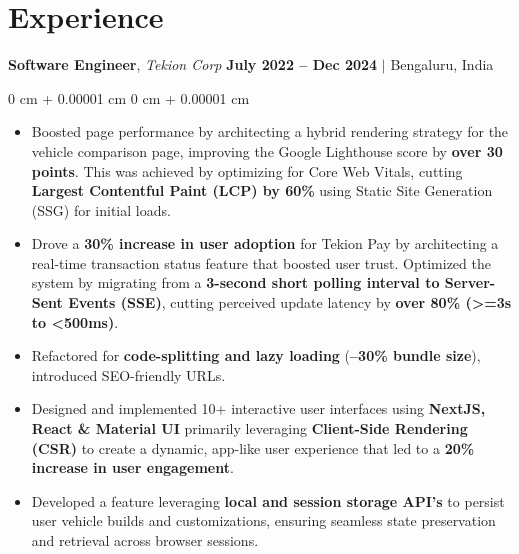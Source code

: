 \documentclass[10pt, letterpaper]{article}
\newenvironment{highlights}{
    \begin{itemize}[
        topsep=0.10 cm,     %
        parsep=0.10 cm,     %
        partopsep=0pt,      %
        itemsep=0pt,        %
        leftmargin=0 cm + 10pt  %
    ]
}{
    \end{itemize}
}
\newenvironment{onecolentry}{
    \begin{adjustwidth}{
        0 cm + 0.00001 cm
    }{
        0 cm + 0.00001 cm
    }
}{
    \end{adjustwidth}
}
\begin{document}
        \vspace{0.1cm}



    
    \section{Experience}

        \noindent
        \textbf{Software Engineer}, {\color{darkgray}\textit{Tekion Corp}} \hfill {\color{darkgray}\small{\textbf{July 2022 – Dec 2024} $|$ Bengaluru, India }}

        \vspace{0.20 cm}
        \begin{onecolentry}
            \begin{highlights}
                \item Boosted page performance by architecting a hybrid rendering strategy for the vehicle comparison page, improving the Google Lighthouse score by \textbf{over 30 points}. This was achieved by optimizing for Core Web Vitals, cutting \textbf{Largest Contentful Paint (LCP) by 60\%} using Static Site Generation (SSG) for initial loads.
                \item Drove a \textbf{30\% increase in user adoption} for Tekion Pay by architecting a real-time transaction status feature that boosted user trust. Optimized the system by migrating from a \textbf{3-second short polling interval to Server-Sent Events (SSE)}, cutting perceived update latency by \textbf{over 80\% (>=3s to <500ms)}.
                \item Refactored for \textbf{code-splitting and lazy loading} (\textbf{–30\% bundle size}), introduced SEO-friendly URLs.
                \item Designed and implemented 10+ interactive user interfaces using \textbf{NextJS, React \& Material UI} primarily leveraging \textbf{Client-Side Rendering (CSR)} to create a dynamic, app-like user experience that led to a \textbf{20\% increase in user engagement}.
                \item Developed a feature leveraging \textbf{local and session storage API's} to persist user vehicle builds and customizations, ensuring seamless state preservation and retrieval across browser sessions.
            \end{highlights}
        \end{onecolentry}
\end{document}
